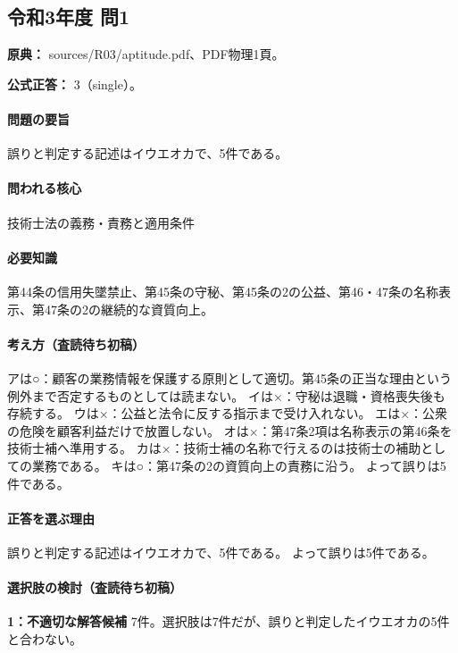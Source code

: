\subsection{令和3年度 問1}
\label{q:r03-reg-apt-01}

\noindent\textbf{原典：} sources/R03/aptitude.pdf、PDF物理1頁。

\textbf{公式正答：} 3（single）。

\paragraph{問題の要旨} 誤りと判定する記述はイウエオカで、5件である。

\paragraph{問われる核心} 技術士法の義務・責務と適用条件

\paragraph{必要知識} 第44条の信用失墜禁止、第45条の守秘、第45条の2の公益、第46・47条の名称表示、第47条の2の継続的な資質向上。

\paragraph{考え方（査読待ち初稿）} アは○：顧客の業務情報を保護する原則として適切。第45条の正当な理由という例外まで否定するものとしては読まない。 イは×：守秘は退職・資格喪失後も存続する。 ウは×：公益と法令に反する指示まで受け入れない。 エは×：公衆の危険を顧客利益だけで放置しない。 オは×：第47条2項は名称表示の第46条を技術士補へ準用する。 カは×：技術士補の名称で行えるのは技術士の補助としての業務である。 キは○：第47条の2の資質向上の責務に沿う。 よって誤りは5件である。

\paragraph{正答を選ぶ理由} 誤りと判定する記述はイウエオカで、5件である。  よって誤りは5件である。

\paragraph{選択肢の検討（査読待ち初稿）}\mbox{}\par

\noindent\textbf{1：不適切な解答候補} 7件。選択肢は7件だが、誤りと判定したイウエオカの5件と合わない。\par

